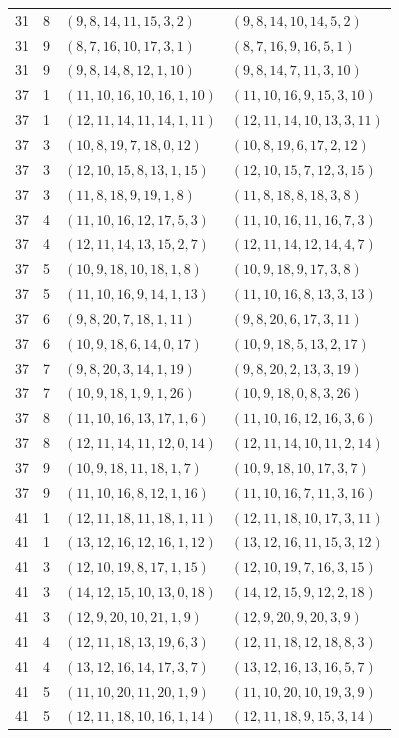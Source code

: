\documentclass[11pt,a4paper]{article}
\theoremstyle{definition}
\numberwithin{equation}{section}
\begin{document}
\begin{longtable}{rrll}
31&8&$(9,8,14,11,15,3,2)$&$(9,8,14,10,14,5,2)$\\
31&9&$(8,7,16,10,17,3,1)$&$(8,7,16,9,16,5,1)$\\
31&9&$(9,8,14,8,12,1,10)$&$(9,8,14,7,11,3,10)$\\
37&1&$(11,10,16,10,16,1,10)$&$(11,10,16,9,15,3,10)$\\
37&1&$(12,11,14,11,14,1,11)$&$(12,11,14,10,13,3,11)$\\
37&3&$(10,8,19,7,18,0,12)$&$(10,8,19,6,17,2,12)$\\
37&3&$(12,10,15,8,13,1,15)$&$(12,10,15,7,12,3,15)$\\
37&3&$(11,8,18,9,19,1,8)$&$(11,8,18,8,18,3,8)$\\
37&4&$(11,10,16,12,17,5,3)$&$(11,10,16,11,16,7,3)$\\
37&4&$(12,11,14,13,15,2,7)$&$(12,11,14,12,14,4,7)$\\
37&5&$(10,9,18,10,18,1,8)$&$(10,9,18,9,17,3,8)$\\
37&5&$(11,10,16,9,14,1,13)$&$(11,10,16,8,13,3,13)$\\
37&6&$(9,8,20,7,18,1,11)$&$(9,8,20,6,17,3,11)$\\
37&6&$(10,9,18,6,14,0,17)$&$(10,9,18,5,13,2,17)$\\
37&7&$(9,8,20,3,14,1,19)$&$(9,8,20,2,13,3,19)$\\
37&7&$(10,9,18,1,9,1,26)$&$(10,9,18,0,8,3,26)$\\
37&8&$(11,10,16,13,17,1,6)$&$(11,10,16,12,16,3,6)$\\
37&8&$(12,11,14,11,12,0,14)$&$(12,11,14,10,11,2,14)$\\
37&9&$(10,9,18,11,18,1,7)$&$(10,9,18,10,17,3,7)$\\
37&9&$(11,10,16,8,12,1,16)$&$(11,10,16,7,11,3,16)$\\
41&1&$(12,11,18,11,18,1,11)$&$(12,11,18,10,17,3,11)$\\
41&1&$(13,12,16,12,16,1,12)$&$(13,12,16,11,15,3,12)$\\
41&3&$(12,10,19,8,17,1,15)$&$(12,10,19,7,16,3,15)$\\
41&3&$(14,12,15,10,13,0,18)$&$(14,12,15,9,12,2,18)$\\
41&3&$(12,9,20,10,21,1,9)$&$(12,9,20,9,20,3,9)$\\
41&4&$(12,11,18,13,19,6,3)$&$(12,11,18,12,18,8,3)$\\
41&4&$(13,12,16,14,17,3,7)$&$(13,12,16,13,16,5,7)$\\
41&5&$(11,10,20,11,20,1,9)$&$(11,10,20,10,19,3,9)$\\
41&5&$(12,11,18,10,16,1,14)$&$(12,11,18,9,15,3,14)$\\

\end{longtable}
\end{document}
